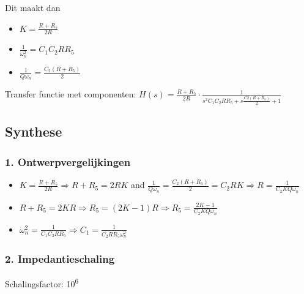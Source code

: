 \documentclass[a4paper,]{article}
\providecommand{\tightlist}{%
  \setlength{\itemsep}{0pt}\setlength{\parskip}{0pt}}
\begin{document}
Dit maakt dan

\begin{itemize}
\tightlist
\item
  \(K = \frac{R+R_5}{2R}\)
\item
  \(\frac{1}{\omega_n^2} = C_1C_2RR_5\)
\item
  \(\frac{1}{Q\omega_n}=\frac{C_2(R+R_5)}{2}\)
\end{itemize}

Transfer functie met componenten:
\(H(s) = \frac{R+R_5}{2R} \cdot \frac{1}{s^2C_1C_2RR_5+s\frac{C2(R+R_5)}{2}+1}\)

\hypertarget{synthese}{%
\subsection{Synthese}\label{synthese}}

\hypertarget{ontwerpvergelijkingen}{%
\subsubsection{1. Ontwerpvergelijkingen}\label{ontwerpvergelijkingen}}

\begin{itemize}
\tightlist
\item
  \(K = \frac{R+R_5}{2R} \Rightarrow R + R_5 = 2RK\) and
  \(\frac{1}{Q\omega_n} = \frac{C_2(R+R_5)}{2} = C_2RK \Rightarrow R = \frac{1}{C_2KQ\omega_n}\)
\item
  \(R+R_5 = 2KR \Rightarrow R_5 = (2K-1)R \Rightarrow R_5 = \frac{2K-1}{C_2KQ\omega_n}\)
\item
  \(\omega_n^2=\frac{1}{C_1C_2RR_5} \Rightarrow C_1 = \frac{1}{C_2RR_5\omega_n^2}\)
\end{itemize}

\hypertarget{impedantieschaling}{%
\subsubsection{2. Impedantieschaling}\label{impedantieschaling}}

Schalingsfactor: 10\textsuperscript{6}
\end{document}

